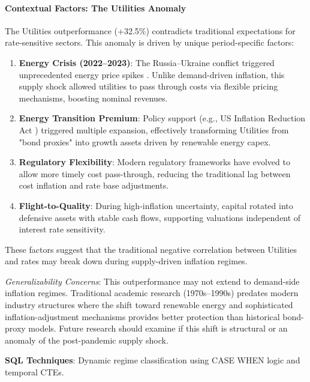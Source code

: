 \documentclass[10pt,a4paper]{article}
\begin{document}
\paragraph{Contextual Factors: The Utilities Anomaly}
The Utilities outperformance (+32.5\%) contradicts traditional expectations for rate-sensitive sectors. This anomaly is driven by unique period-specific factors:
\begin{enumerate}
    \item \textbf{Energy Crisis (2022--2023)}: The Russia--Ukraine conflict triggered unprecedented energy price spikes \cite{russia_ukraine_energy2022}. Unlike demand-driven inflation, this supply shock allowed utilities to pass through costs via flexible pricing mechanisms, boosting nominal revenues.
    \item \textbf{Energy Transition Premium}: Policy support (e.g., US Inflation Reduction Act \cite{ira2022}) triggered multiple expansion, effectively transforming Utilities from "bond proxies" into growth assets driven by renewable energy capex.
    \item \textbf{Regulatory Flexibility}: Modern regulatory frameworks have evolved to allow more timely cost pass-through, reducing the traditional lag between cost inflation and rate base adjustments.
    \item \textbf{Flight-to-Quality}: During high-inflation uncertainty, capital rotated into defensive assets with stable cash flows, supporting valuations independent of interest rate sensitivity.
\end{enumerate}
These factors suggest that the traditional negative correlation between Utilities and rates may break down during supply-driven inflation regimes.

\textit{Generalizability Concerns}: This outperformance may not extend to demand-side inflation regimes. Traditional academic research (1970s--1990s) predates modern industry structures where the shift toward renewable energy and sophisticated inflation-adjustment mechanisms provides better protection than historical bond-proxy models. Future research should examine if this shift is structural or an anomaly of the post-pandemic supply shock.

\textbf{SQL Techniques}: Dynamic regime classification using CASE WHEN logic and temporal CTEs.
\end{document}
